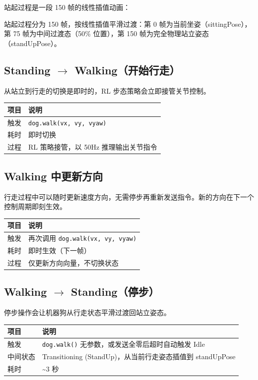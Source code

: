 \documentclass[a4paper,11pt,openany]{book}
\begin{document}
站起过程是一段 150 帧的线性插值动画：

站起过程分为 150 帧，按线性插值平滑过渡：第 0 帧为当前坐姿（sittingPose），第 75 帧为中间过渡态（50\% 位置），第 150 帧为完全物理站立姿态（standUpPose）。

\subsection{Standing $\to$ Walking（开始行走）}

从站立到行走的切换是即时的，RL 步态策略会立即接管关节控制。

\begin{longtable}{ll}
\toprule
项目 & 说明 \\
\midrule
\endhead
触发 & \texttt{dog.walk(vx, vy, vyaw)} \\
耗时 & 即时切换 \\
过程 & RL 策略接管，以 50Hz 推理输出关节指令 \\
\bottomrule
\end{longtable}

\subsection{Walking 中更新方向}

行走过程中可以随时更新速度方向，无需停步再重新发送指令。新的方向在下一个控制周期即刻生效。

\begin{longtable}{ll}
\toprule
项目 & 说明 \\
\midrule
\endhead
触发 & 再次调用 \texttt{dog.walk(vx, vy, vyaw)} \\
耗时 & 即时生效（下一帧） \\
过程 & 仅更新方向向量，不切换状态 \\
\bottomrule
\end{longtable}

\subsection{Walking $\to$ Standing（停步）}

停步操作会让机器狗从行走状态平滑过渡回站立姿态。

\begin{longtable}{ll}
\toprule
项目 & 说明 \\
\midrule
\endhead
触发 & \texttt{dog.walk()} 无参数，或发送全零后超时自动触发 Idle \\
中间状态 & Transitioning (StandUp)，从当前行走姿态插值到 standUpPose \\
耗时 & \textasciitilde 3 秒 \\
\bottomrule
\end{longtable}
\end{document}
